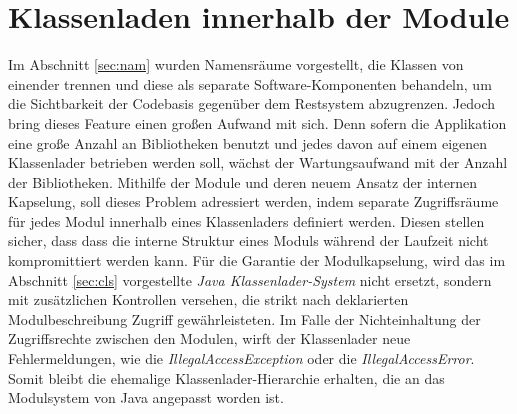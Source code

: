   \section{Klassenladen innerhalb der Module} \label{sec:mod-cll}
    Im Abschnitt \ref{sec:nam} wurden Namensräume vorgestellt, die Klassen von einender trennen und diese als separate Software-Komponenten behandeln, um die Sichtbarkeit der Codebasis gegenüber dem Restsystem abzugrenzen. Jedoch bring dieses Feature einen großen Aufwand mit sich. Denn sofern die Applikation eine große Anzahl an Bibliotheken benutzt und jedes davon auf einem eigenen Klassenlader betrieben werden soll, wächst der Wartungsaufwand mit der Anzahl der Bibliotheken.\newline
    Mithilfe der Module und deren neuem Ansatz der internen Kapselung, soll dieses Problem adressiert werden, indem separate Zugriffsräume für jedes Modul innerhalb eines Klassenladers definiert werden. Diesen stellen sicher, dass dass die interne Struktur eines Moduls während der Laufzeit nicht kompromittiert werden kann.\newline
    Für die Garantie der Modulkapselung, wird das im Abschnitt \ref{sec:cls} vorgestellte \textit{Java Klassenlader-System} nicht ersetzt, sondern mit zusätzlichen Kontrollen versehen, die strikt nach deklarierten Modulbeschreibung Zugriff gewährleisteten. Im Falle der Nichteinhaltung der Zugriffsrechte zwischen den Modulen, wirft der Klassenlader neue Fehlermeldungen, wie die \textit{IllegalAccessException} oder die \textit{IllegalAccessError}. Somit bleibt die ehemalige Klassenlader-Hierarchie erhalten, die an das Modulsystem von Java angepasst worden ist. \cite{classLoadingOracle, modulMitJava9}\bigbreak

